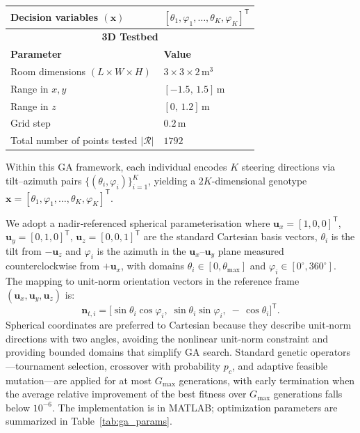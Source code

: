\documentclass[journal]{IEEEtran}
\begin{document}
\begin{table}[tbh]
\begin{tabular}{|l|l|}
Decision variables $(\mathbf x)$    & \([\theta_{1},\varphi_{1},\dots,\theta_{K},\varphi_{K}]^{\mathsf T}\) \\ \hline
\multicolumn{2}{|c|}{\textbf{3D Testbed}} \\ \hline
\textbf{Parameter}                  & \textbf{Value}                         \\ \hline
Room dimensions \((L\times W \times H)\) & \(3 \times 3 \times 2\,\mathrm{m^3}\)  \\ \hline
Range in \(x,y\)                    & \([-1.5,\,1.5]\,\mathrm{m}\)           \\ \hline
Range in \(z\)                      & \([0,\,1.2]\,\mathrm{m}\)              \\ \hline
Grid step                           & \(0.2\,\mathrm{m}\)                    \\ \hline
Total number of points tested $|\mathcal{R}|$  & \(1792\)                               \\ \hline
\end{tabular}
\end{table}

Within this GA framework, each individual encodes \(K\) steering directions via tilt–azimuth pairs \(\{(\theta_i,\varphi_i)\}_{i=1}^{K}\), yielding a \(2K\)-dimensional genotype \(\mathbf x = [\theta_1,\varphi_1,\dots,\theta_K,\varphi_K]^{\mathsf T}\).

We adopt a nadir‐referenced spherical parameterisation where $\mathbf u_x=[1,0,0]^{\mathsf T}$, $\mathbf u_y=[0,1,0]^{\mathsf T}$, $\mathbf u_z=[0,0,1]^{\mathsf T}$ are the standard Cartesian basis vectors, \(\theta_i\) is the tilt from \(-\mathbf u_z\) and \(\varphi_i\) is the azimuth in the \(\mathbf u_x\)–\( \mathbf u_y\) plane measured counterclockwise from \(+\mathbf u_x\), with domains \(\theta_i\in[0,\theta_{\max}]\) and \(\varphi_i\in[0^\circ,360^\circ]\). The mapping to unit‐norm orientation vectors in the reference frame \((\mathbf u_x,\mathbf u_y,\mathbf u_z)\) is:
\begin{equation}
\mathbf n_{t,i}
= \bigl[\sin\theta_i\cos\varphi_i,\;\sin\theta_i\sin\varphi_i,\;-\,\cos\theta_i\bigr]^{\mathsf T}.
\end{equation}
Spherical coordinates are preferred to Cartesian because they describe unit‐norm directions with two angles, avoiding the nonlinear unit‐norm constraint and providing bounded domains that simplify GA search.
Standard genetic operators—tournament selection, crossover with probability \(p_c\), and adaptive feasible mutation—are applied for at most \(G_{\max}\) generations, 
with early termination when the average relative improvement of the best fitness over \(G_{\max}\) generations falls below \(10^{-6}\).
The implementation is in MATLAB; optimization parameters are summarized in Table~\ref{tab:ga_params}.
\end{document}
